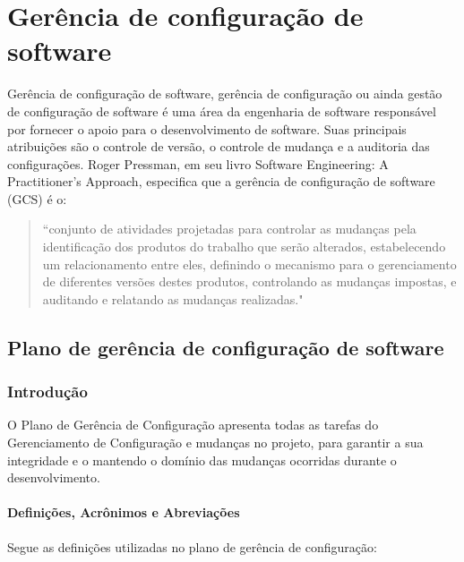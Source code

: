 \section{Gerência de configuração de software}
\label{sec:gerenciaconfig}

Gerência de configuração de software, gerência de configuração ou ainda gestão de configuração de software é uma área da engenharia de software responsável por fornecer o apoio para o desenvolvimento de software. Suas principais atribuições são o controle de versão, o controle de mudança e a auditoria das configurações. Roger Pressman, em seu livro Software Engineering: A Practitioner's Approach, especifica que a gerência de configuração de software (GCS) é o:

\begin{quote}
“conjunto de atividades projetadas para controlar as mudanças pela identificação dos produtos do trabalho que serão alterados, estabelecendo um relacionamento entre eles, definindo o mecanismo para o gerenciamento de diferentes versões destes produtos, controlando as mudanças impostas, e auditando e relatando as mudanças realizadas."
\end{quote}

\subsection{Plano de gerência de configuração de software}

\subsubsection{Introdução}

O Plano de Gerência de Configuração apresenta todas as tarefas do Gerenciamento de Configuração e mudanças no projeto, para garantir a sua integridade e o mantendo o domínio das mudanças ocorridas durante o desenvolvimento. 

\paragraph{Definições, Acrônimos e Abreviações}

Segue as definições utilizadas no plano de gerência de configuração:

